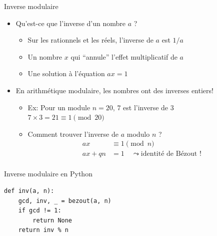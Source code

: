 \documentclass{main}
\begin{document}
\begin{frame}{Inverse modulaire}
    \begin{itemize}
        \item Qu’est-ce que l’inverse d’un nombre $a$ ?
        \begin{itemize}
            \pause
            \item Sur les rationnels et les réels, l’inverse de $a$ est $1 / a$
            \pause
            \item Un nombre $x$ qui \enquote{annule} l’effet multiplicatif de $a$
            \pause
            \item Une solution à l’équation $ax = 1$
        \end{itemize}
        \item En arithmétique modulaire, les nombres ont des inverses entiers!
        \begin{itemize}
            \item Ex: Pour un module $n = 20$, $7$ est l’inverse de $3$\\
                \quad\quad$7 \times 3 = 21 \equiv 1 \pmod{20}$
            \item Comment trouver l’inverse de $a$ modulo $n$ ?
            \pause
            \begin{align*}
                ax &\equiv 1 \pmod{n}\\
                ax + qn &= 1 \quad\leadsto \text{identité de Bézout !}\\
            \end{align*}
        \end{itemize}
    \end{itemize}
\end{frame}

\begin{frame}[fragile]{Inverse modulaire en Python}
    \begin{verbatim}
def inv(a, n):
    gcd, inv, _ = bezout(a, n)
    if gcd != 1:
        return None
    return inv % n
    \end{verbatim}
\end{frame}
\end{document}
